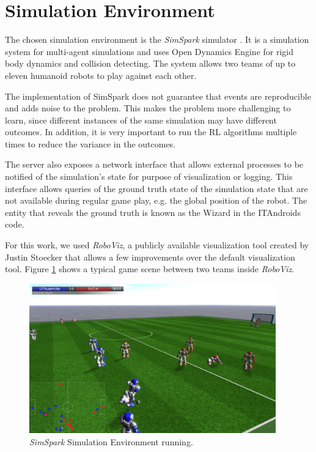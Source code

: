\section{Simulation Environment}

The chosen simulation environment is the \textit{SimSpark} simulator \cite{SimSpark}. 
It is a simulation system for multi-agent simulations and uses Open Dynamics Engine \cite{ODE} for rigid body dynamics and collision detecting.
The system allows two teams of up to eleven humanoid robots to play against each other.

The implementation of SimSpark does not guarantee that events are reproducible and adds noise to the problem.
This makes the problem more challenging to learn, since different instances of the same simulation may have different outcomes.
In addition, it is very important to run the RL algorithms multiple times to reduce the variance in the outcomes.

The server also exposes a network interface that allows external processes to be notified of the simulation's state
for purpose of visualization or logging. This interface allows queries of the ground truth state of 
the simulation state that are not available during regular game play, e.g. the global position of the robot.
The entity that reveals the ground truth is known as the Wizard in the ITAndroids code.

For this work, we used \textit{RoboViz}, a publicly available visualization tool created by Justin Stoecker \cite{RoboViz} that allows a few
improvements over the default visualization tool. Figure \ref{fig:sim3d} shows a typical game scene between two teams inside \textit{RoboViz}.

\begin{figure}[H]
     \centering
     \includegraphics[width=0.95\textwidth]{Chapter5/sim3d.png}
     \caption{\textit{SimSpark} Simulation Environment running.}
     \label{fig:sim3d}
\end{figure}

